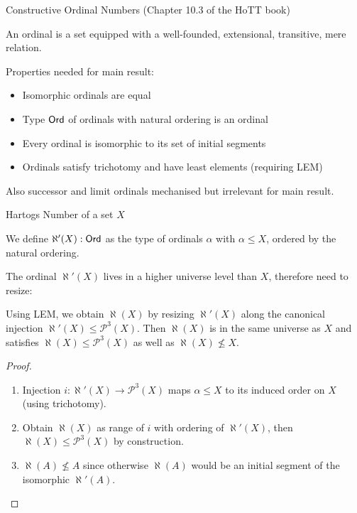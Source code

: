 \documentclass[xcolor=dvipsnames,compress,aspectratio=169,handout]{beamer}
\newcommand{\MCL}[1]{\ensuremath{\mathcal{#1}}\xspace} %
\newcommand{\Pow}{\MCL P}
\begin{document}
\begin{frame}{Constructive Ordinal Numbers (Chapter 10.3 of the HoTT book)}
	\begin{definition}
		An ordinal is a set equipped with a well-founded, extensional, transitive, mere relation.
	\end{definition}

	\vspace{0.5cm}
	Properties needed for main result:
	\begin{itemize}
		\vspace{0.2cm}
		\item
		Isomorphic ordinals are equal
		\vspace{0.2cm}
		\item
		Type $\mathsf{Ord}$ of ordinals with natural ordering is an ordinal
		\vspace{0.2cm}
		\item
		Every ordinal is isomorphic to its set of initial segments
		\vspace{0.2cm}
		\item
		Ordinals satisfy trichotomy and have least elements (requiring LEM)
	\end{itemize}

	\vspace{0.5cm}
	Also successor and limit ordinals mechanised but irrelevant for main result.
\end{frame}

\begin{frame}{Hartogs Number of a set $X$}
	\begin{definition}
		We define $\aleph'(X):\mathsf{Ord}$ as the type of ordinals $\alpha$ with $\alpha \le X$, ordered by the natural ordering.
	\end{definition}

	\vspace{0.3cm}
	The ordinal $\aleph'(X)$ lives in a higher universe level than $X$, therefore need to resize:
	
	\begin{theorem}
		Using LEM, we obtain $\aleph(X)$ by resizing $\aleph'(X)$ along the canonical injection $\aleph'(X)\le\Pow^3(X)$.
		Then $\aleph(X)$ is in the same universe as $X$ and satisfies $\aleph(X)\le\Pow^3(X)$ as well as $\aleph(X)\not\le X$.
	\end{theorem}
	\begin{proof}
		\begin{enumerate}
			\item
			Injection $i: \aleph'(X)\to\Pow^3(X)$ maps $\alpha\le X$ to its induced order on $X$ (using trichotomy).
			\item
			Obtain $\aleph(X)$ as range of $i$ with ordering of $\aleph'(X)$, then $\aleph(X)\le\Pow^3(X)$ by construction.
			\item
			$\aleph(A)\not\le A$ since otherwise $\aleph(A)$ would be an initial segment of the isomorphic $\aleph'(A)$.
			\qedhere
		\end{enumerate}
	\end{proof}
\end{frame}
\end{document}
